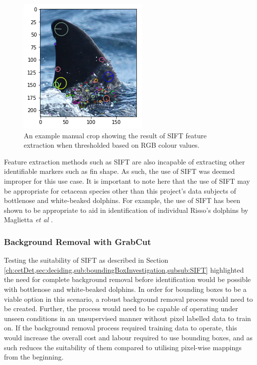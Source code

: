 \begin{figure}
	\begin{center}
		\includegraphics[scale=0.6]{Chapter3/figs/manual-crop-sift-colour-thresholding.png}
	\end{center}
	\caption{An example manual crop showing the result of SIFT feature extraction when thresholded based on RGB colour values.
	}
	\label{fig:manual-crop-sift-colour-thresholding-example}
\end{figure}

Feature extraction methods such as SIFT are also incapable of extracting other identifiable markers such as fin shape. As such, the use of SIFT was deemed improper for this use case. It is important to note here that the use of SIFT may be appropriate for cetacean species other than this project's data subjects of bottlenose and white-beaked dolphins. For example, the use of SIFT has been shown to be appropriate to aid in identification of individual Risso's dolphins by Maglietta \textit{et al} \cite{reno_sift-based_2019}.

\subsubsection{Background Removal with GrabCut}\label{ch:cetDet,sec:deciding,sub:boundingBoxInvestigation,subsub:GrabCut}

Testing the suitability of SIFT as described in Section \ref{ch:cetDet,sec:deciding,sub:boundingBoxInvestigation,subsub:SIFT} highlighted the need for complete background removal before identification would be possible with bottlenose and white-beaked dolphins. In order for bounding boxes to be a viable option in this scenario, a robust background removal process would need to be created. Further, the process would need to be capable of operating under unseen conditions in an unsupervised manner without pixel labelled data to train on. If the background removal process required training data to operate, this would increase the overall cost and labour required to use bounding boxes, and as such reduces the suitability of them compared to utilising pixel-wise mappings from the beginning.

